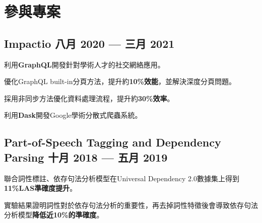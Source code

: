 \section{參與專案}



\subsection*{Impactio \hfill 八月 2020 --- 三月 2021} 
    \begin{zitemize}
        \item 利用\textbf{GraphQL}開發針對學術人才的社交網絡應用。
        \item 優化GraphQL built-in分頁方法，提升約\textbf{10\%效能}，並解決深度分頁問題。
        \item 採用非同步方法優化資料處理流程，提升約\textbf{30\%效率}。
        \item 利用\textbf{Dask}開發Google學術分散式爬蟲系統。
    \end{zitemize}


\subsection*{Part-of-Speech Tagging and Dependency Parsing \hfill 十月 2018 --- 五月 2019} 
    \begin{zitemize}
        \item 聯合詞性標註、依存句法分析模型在Universal Dependency 2.0數據集上得到\textbf{11\%LAS準確度提升}。
        \item 實驗結果證明詞性對於依存句法分析的重要性，再去掉詞性特徵後會導致依存句法分析模型\textbf{降低近10\%的準確度}。
    \end{zitemize}



